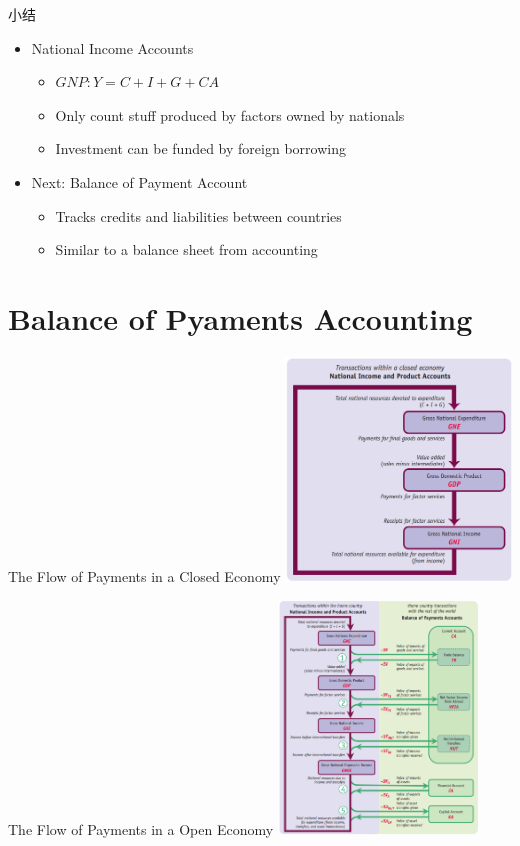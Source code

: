 \documentclass[10pt,hyperref={CJKbookmarks=true},xcolor=dvipsnames,aspectratio=169]{beamer}
\begin{document}
\begin{frame}{小结}
\begin{itemize}
\item National Income Accounts
\begin{itemize}
\item $GNP: Y = C + I + G + CA$
\item Only count stuff produced by factors owned by nationals
\item Investment can be funded by foreign borrowing
\end{itemize}
\item Next: Balance of Payment Account
\begin{itemize}
\item Tracks credits and liabilities between countries 
\item Similar to a balance sheet from accounting
\end{itemize}
\end{itemize}
\end{frame}

\section{Balance of Pyaments Accounting}

\begin{frame}{The Flow of Payments in a Closed Economy}
	\centering
	\includegraphics[width=0.45\textwidth]{fig/bop/closegdp.png}
\end{frame}

\begin{frame}{The Flow of Payments in a Open Economy}
\centering
\includegraphics[width=0.4\textwidth]{fig/bop/opengdp.png}
\end{frame}
\end{document}
